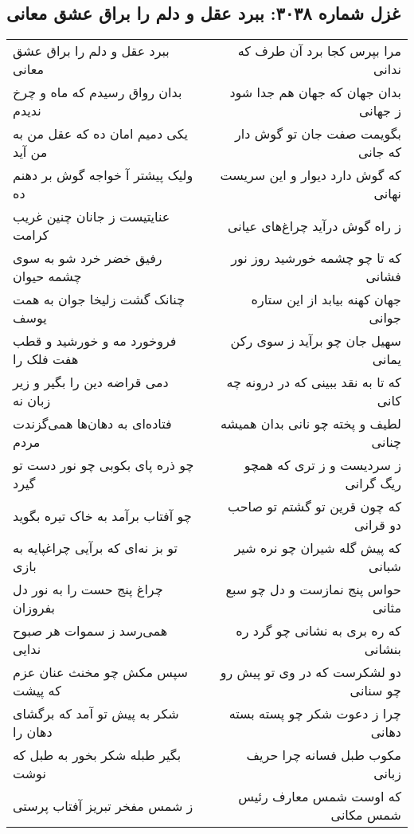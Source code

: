 \begin{center}
\section*{غزل شماره ۳۰۳۸: ببرد عقل و دلم را براق عشق معانی}
\label{sec:3038}
\begin{longtable}{l p{0.5cm} r}
ببرد عقل و دلم را براق عشق معانی
&&
مرا بپرس کجا برد آن طرف که ندانی
\\
بدان رواق رسیدم که ماه و چرخ ندیدم
&&
بدان جهان که جهان هم جدا شود ز جهانی
\\
یکی دمیم امان ده که عقل من به من آید
&&
بگویمت صفت جان تو گوش دار که جانی
\\
ولیک پیشتر آ خواجه گوش بر دهنم ده
&&
که گوش دارد دیوار و این سریست نهانی
\\
عنایتیست ز جانان چنین غریب کرامت
&&
ز راه گوش درآید چراغ‌های عیانی
\\
رفیق خضر خرد شو به سوی چشمه حیوان
&&
که تا چو چشمه خورشید روز نور فشانی
\\
چنانک گشت زلیخا جوان به همت یوسف
&&
جهان کهنه بیابد از این ستاره جوانی
\\
فروخورد مه و خورشید و قطب هفت فلک را
&&
سهیل جان چو برآید ز سوی رکن یمانی
\\
دمی قراضه دین را بگیر و زیر زبان نه
&&
که تا به نقد ببینی که در درونه چه کانی
\\
فتاده‌ای به دهان‌ها همی‌گزندت مردم
&&
لطیف و پخته چو نانی بدان همیشه چنانی
\\
چو ذره پای بکوبی چو نور دست تو گیرد
&&
ز سردیست و ز تری که همچو ریگ گرانی
\\
چو آفتاب برآمد به خاک تیره بگوید
&&
که چون قرین تو گشتم تو صاحب دو قرانی
\\
تو بز نه‌ای که برآیی چراغپایه به بازی
&&
که پیش گله شیران چو نره شیر شبانی
\\
چراغ پنج حست را به نور دل بفروزان
&&
حواس پنج نمازست و دل چو سبع مثانی
\\
همی‌رسد ز سموات هر صبوح ندایی
&&
که ره بری به نشانی چو گرد ره بنشانی
\\
سپس مکش چو مخنث عنان عزم که پیشت
&&
دو لشکرست که در وی تو پیش رو چو سنانی
\\
شکر به پیش تو آمد که برگشای دهان را
&&
چرا ز دعوت شکر چو پسته بسته دهانی
\\
بگیر طبله شکر بخور به طبل که نوشت
&&
مکوب طبل فسانه چرا حریف زبانی
\\
ز شمس مفخر تبریز آفتاب پرستی
&&
که اوست شمس معارف رئیس شمس مکانی
\\
\end{longtable}
\end{center}
